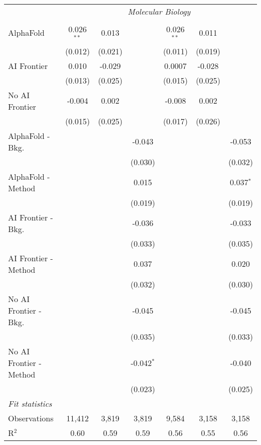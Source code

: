 \begin{tabular}{lcccccc}
 & \multicolumn{6}{c}{\textit{Molecular Biology}} \\ \\
   AlphaFold               & 0.026$^{**}$ & 0.013   &              & 0.026$^{**}$ & 0.011   &   \\   
                           & (0.012)      & (0.021) &              & (0.011)      & (0.019) &   \\   
   AI Frontier             & 0.010        & -0.029  &              & 0.0007       & -0.028  &   \\   
                           & (0.013)      & (0.025) &              & (0.015)      & (0.025) &   \\   
   No AI Frontier          & -0.004       & 0.002   &              & -0.008       & 0.002   &   \\   
                           & (0.015)      & (0.025) &              & (0.017)      & (0.026) &   \\   
   AlphaFold - Bkg.        &              &         & -0.043       &              &         & -0.053\\   
                           &              &         & (0.030)      &              &         & (0.032)\\   
   AlphaFold - Method      &              &         & 0.015        &              &         & 0.037$^{*}$\\   
                           &              &         & (0.019)      &              &         & (0.019)\\   
   AI Frontier - Bkg.      &              &         & -0.036       &              &         & -0.033\\   
                           &              &         & (0.033)      &              &         & (0.035)\\   
   AI Frontier - Method    &              &         & 0.037        &              &         & 0.020\\   
                           &              &         & (0.032)      &              &         & (0.030)\\   
   No AI Frontier - Bkg.   &              &         & -0.045       &              &         & -0.045\\   
                           &              &         & (0.035)      &              &         & (0.033)\\   
   No AI Frontier - Method &              &         & -0.042$^{*}$ &              &         & -0.040\\   
                           &              &         & (0.023)      &              &         & (0.025)\\   
   \midrule
   \emph{Fit statistics}\\
   Observations            & 11,412       & 3,819   & 3,819        & 9,584        & 3,158   & 3,158\\  
   R$^2$                   & 0.60         & 0.59    & 0.59         & 0.56         & 0.55    & 0.56\\  
   

\end{tabular}
